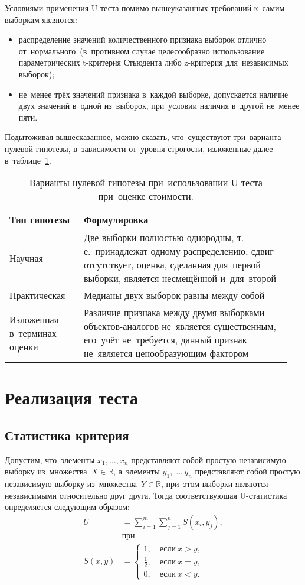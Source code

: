 \documentclass[]{scrreprt}
\begin{document}
Условиями применения U-теста помимо вышеуказанных требований к~самим выборкам являются:
\begin{itemize}
	\item распределение значений количественного признака выборок отлично от~нормального~(в~противном случае целесообразно использование параметрических t-критерия Стьюдента либо z-критерия для~независимых выборок);
	\item не~менее трёх значений признака в~каждой выборке, допускается наличие двух значений в~одной из~выборок, при~условии наличия в~другой не~менее пяти.
	\end{itemize}
Подытоживая вышесказанное, можно сказать, что~существуют три~варианта нулевой гипотезы, в~зависимости от~уровня строгости, изложенные далее в~таблице~\ref{tab:nul-hypothesis-variants}.
\begin{table}[ht]
	\caption{Варианты нулевой гипотезы при~использовании U-теста при~оценке стоимости.}  \label{tab:nul-hypothesis-variants}
	\centering
	\begin{tabularx}{\textwidth}{p{0.25\linewidth} p{0.7\linewidth}} 
		\hline
		Тип гипотезы&Формулировка\\
		 \hline
		Научная&Две выборки полностью однородны, т.\,е.~принадлежат одному распределению, сдвиг отсутствует, оценка, сделанная для~первой выборки, является несмещённой и~для~второй\\
		 \hline
		Практическая&Медианы двух выборок равны между собой\\
		 \hline
		Изложенная в~терминах оценки&Различие признака между двумя выборками объектов-аналогов не~является существенным, его~учёт не~требуется, данный признак не~является ценообразующим фактором\\ \hline
	\end{tabularx}
\end{table}
\section{Реализация теста}
\subsection{Статистика критерия}
Допустим, что~элементы ${\textstyle x_{1},\ldots,x_{n}}$ представляют собой простую независимую выборку из~множества~${\textstyle X \in \mathbb{R}}$, а~элементы ${\textstyle y_{1},\ldots,y_{n}}$ представляют собой простую независимую выборку из~множества~${\textstyle Y \in \mathbb{R}}$, при~этом выборки являются независимыми относительно друг друга. Тогда соответствующая U-статистика определяется следующим образом:
\begin{equation}\label{eq:U-statistic-base-formula}
	\begin{aligned}
	U&=\sum_{i=1}^{m} \sum_{j=1}^{n} S (x_{i},y_{j}),\\
	&\text{при}\\
	S(x,y)&=
	\begin{cases}
	1,\quad \text{если}\ x>y,\\
	\frac{1}{2},\quad \text{если}\ x=y,\\
	0,\quad \text{если}\ x<y.
	\end{cases}
	\end{aligned}
\end{equation}
\end{document}
